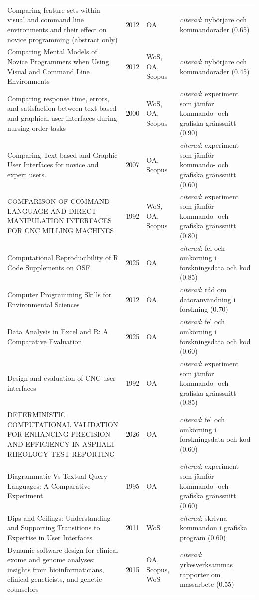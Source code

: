 \begin{longtable}{@{}%
  >{\raggedright\arraybackslash}p{}c%
  >{\raggedright\arraybackslash}p{}%
  >{\raggedright\arraybackslash}p{}@{}}
Comparing feature sets within visual and command line environments and their effect on novice programming (abstract only) & 2012 & OA & \emph{citerad}: nybörjare och kommandorader (0.65) \\
Comparing Mental Models of Novice Programmers when Using Visual and Command Line Environments & 2012 & WoS, OA, Scopus & \emph{citerad}: nybörjare och kommandorader (0.45) \\
Comparing response time, errors, and satisfaction between text-based and graphical user interfaces during nursing order tasks & 2000 & WoS, OA, Scopus & \emph{citerad}: experiment som jämför kommando- och grafiska gränssnitt (0.90) \\
Comparing Text-based and Graphic User Interfaces for novice and expert users. & 2007 & OA, Scopus & \emph{citerad}: experiment som jämför kommando- och grafiska gränssnitt (0.60) \\
COMPARISON OF COMMAND-LANGUAGE AND DIRECT MANIPULATION INTERFACES FOR CNC MILLING MACHINES & 1992 & WoS, OA, Scopus & \emph{citerad}: experiment som jämför kommando- och grafiska gränssnitt (0.80) \\
Computational Reproducibility of R Code Supplements on OSF & 2025 & OA & \emph{citerad}: fel och omkörning i forskningsdata och kod (0.85) \\
Computer Programming Skills for Environmental Sciences & 2012 & OA & \emph{citerad}: råd om datoranvändning i forskning (0.70) \\
Data Analysis in Excel and R: A Comparative Evaluation & 2025 & OA & \emph{citerad}: fel och omkörning i forskningsdata och kod (0.60) \\
Design and evaluation of CNC-user interfaces & 1992 & OA & \emph{citerad}: experiment som jämför kommando- och grafiska gränssnitt (0.85) \\
DETERMINISTIC COMPUTATIONAL VALIDATION FOR ENHANCING PRECISION AND EFFICIENCY IN ASPHALT RHEOLOGY TEST REPORTING & 2026 & OA & \emph{citerad}: fel och omkörning i forskningsdata och kod (0.60) \\
Diagrammatic Vs Textual Query Languages: A Comparative Experiment & 1995 & OA & \emph{citerad}: experiment som jämför kommando- och grafiska gränssnitt (0.60) \\
Dips and Ceilings: Understanding and Supporting Transitions to Expertise in User Interfaces & 2011 & WoS & \emph{citerad}: skrivna kommandon i grafiska program (0.60) \\
Dynamic software design for clinical exome and genome analyses: insights from bioinformaticians, clinical geneticists, and genetic counselors & 2015 & OA, Scopus, WoS & \emph{citerad}: yrkesverksammas rapporter om massarbete (0.55) \\

\end{longtable}
